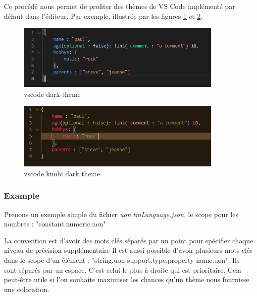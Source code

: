 \documentclass[
    iict, %
    il, %
]{heig-tb}
\begin{document}
Ce procédé nous permet de profiter des thèmes de VS Code implémenté par défaut dans l'éditeur. Par exemple, illustrée par les figures \ref{vscode-dark-theme} et \ref{vscode-kimbi-dark-theme}.

\begin{figure}[!h]
    \begin{center}
        \includegraphics[width=10cm]{assets/figures/vscode-dark-theme.PNG}
    \end{center}
    \caption[UON en Thème vscode dark]{\label{vscode-dark-theme} vscode-dark-theme}
\end{figure}

\begin{figure}[!h]
    \begin{center}
        \includegraphics[width=10cm]{assets/figures/vscode-kimbi-dark-theme.PNG}
    \end{center}
    \caption[UON en Thème vscode kimbi dark]{\label{vscode-kimbi-dark-theme} vscode kimbi dark theme}
\end{figure}

\subsubsection{Example}
Prenons un exemple simple du fichier \emph{uon.tmLanguage.json}, le scope pour les nombres : "constant.numeric.uon"

La convention est d'avoir des mots clés séparés par un point pour spécifier chaque niveau de précision supplémentaire
Il est aussi possible d'avoir plusieurs mots clés dans le scope d'un élément : "string.uon support.type.property-name.uon". Ils sont séparés par un espace.
C'est celui le plus à droite qui est prioritaire. Cela peut-être utile si l'on souhaite maximiser les chances qu'un thème nous fournisse une coloration.
\cite{scopes-selectors}
\end{document}
